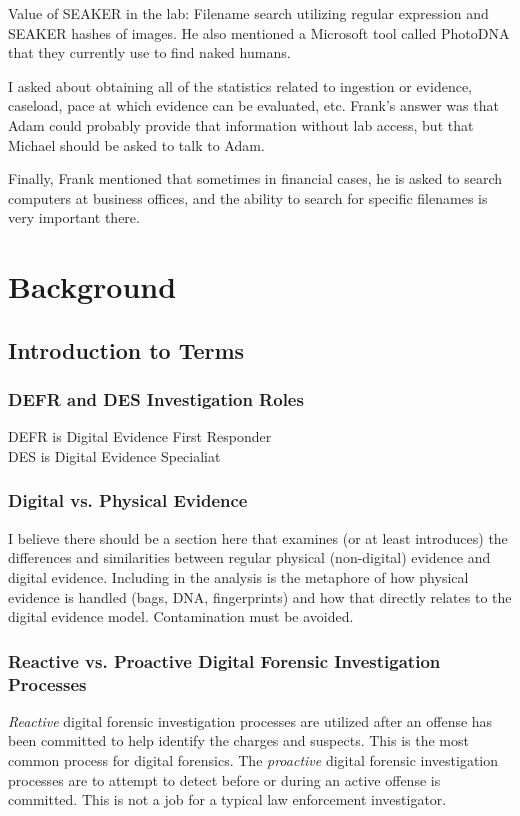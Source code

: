 \documentclass[12pt]{article}
\begin{document}
Value of SEAKER in the lab: Filename search utilizing regular expression and SEAKER hashes of images.  He
also mentioned a Microsoft tool called PhotoDNA that they currently use to find naked humans.

I asked about obtaining all of the statistics related to ingestion or evidence, caseload, pace at which
evidence can be evaluated, etc.  Frank's answer was that Adam could probably provide that information
without lab access, but that Michael should be asked to talk to Adam.

Finally, Frank mentioned that sometimes in financial cases, he is asked to search computers at business
offices, and the ability to search for specific filenames is very important there.

\newpage
\section{Background}
\label{sect-background}

\subsection{Introduction to Terms}
\vspace{0.5 cm}
\subsubsection{DEFR and DES Investigation Roles}
\vspace{0.5 cm}
DEFR is Digital Evidence First Responder\\

DES is Digital Evidence Specialiat\\

\subsubsection{Digital vs. Physical Evidence}
\vspace{0.5 cm}
I believe there should be a section here that examines (or at least introduces) the differences and similarities
between regular physical (non-digital) evidence and digital evidence.  Including in the analysis is the metaphore of
how physical evidence is handled (bags, DNA, fingerprints) and how that directly relates to the digital evidence
model.  Contamination must be avoided.\\

\subsubsection{Reactive vs. Proactive Digital Forensic Investigation Processes}
\vspace{0.5 cm}
\textit{Reactive} digital forensic investigation processes are utilized after an offense has been committed to help
identify the charges and suspects.  This is the most common process for digital forensics.  The \textit{proactive}
digital forensic investigation processes are to attempt to detect before or during an active offense is committed.
This is not a job for a typical law enforcement investigator.\\
\end{document}
